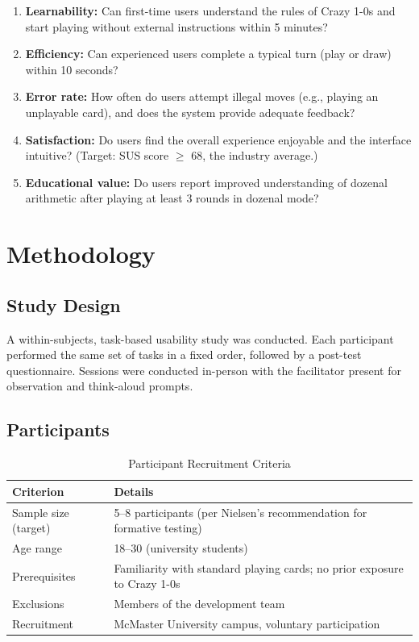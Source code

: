 \documentclass[12pt, titlepage]{article}
\begin{document}
\begin{enumerate}
  \item \textbf{Learnability:} Can first-time users understand the rules of Crazy 1-0s and start playing without external instructions within 5 minutes?
  \item \textbf{Efficiency:} Can experienced users complete a typical turn (play or draw) within 10 seconds?
  \item \textbf{Error rate:} How often do users attempt illegal moves (e.g., playing an unplayable card), and does the system provide adequate feedback?
  \item \textbf{Satisfaction:} Do users find the overall experience enjoyable and the interface intuitive? (Target: SUS score $\geq$ 68, the industry average.)
  \item \textbf{Educational value:} Do users report improved understanding of dozenal arithmetic after playing at least 3 rounds in dozenal mode?
\end{enumerate}


\section{Methodology}\label{sec:methodology}

\subsection{Study Design}

A within-subjects, task-based usability study was conducted. Each participant
performed the same set of tasks in a fixed order, followed by a post-test
questionnaire. Sessions were conducted in-person with the facilitator
present for observation and think-aloud prompts.

\subsection{Participants}

\begin{table}[H]
\centering
\caption{Participant Recruitment Criteria}
\begin{tabularx}{\textwidth}{lX}
\toprule
\textbf{Criterion} & \textbf{Details} \\
\midrule
Sample size (target) & 5--8 participants (per Nielsen's recommendation for formative testing) \\
Age range & 18--30 (university students) \\
Prerequisites & Familiarity with standard playing cards; no prior exposure to Crazy 1-0s \\
Exclusions & Members of the development team \\
Recruitment & McMaster University campus, voluntary participation \\
\bottomrule
\end{tabularx}
\end{table}
\end{document}
